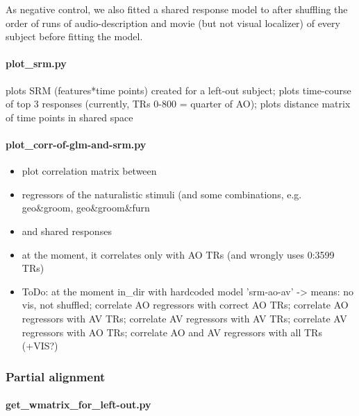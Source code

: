 As negative control, we also fitted a shared response model to after shuffling
the order of runs of audio-description and movie (but not visual localizer) of
every subject before fitting the model.


\paragraph{plot\_srm.py}

%
plots SRM (features*time points) created for a left-out subject; plots
time-course of top 3 responses (currently, TRs 0-800 = quarter of AO); plots
distance matrix of time points in shared space


\paragraph{plot\_corr-of-glm-and-srm.py}
%
\begin{itemize}
    \item plot correlation matrix between
    \item regressors of the naturalistic stimuli (and some combinations, e.g.
        geo\&groom, geo\&groom\&furn
    \item and shared responses
    \item at the moment, it correlates only with AO TRs (and wrongly uses
        0:3599 TRs)
    \item ToDo: at the moment in\_dir with hardcoded model 'srm-ao-av'
    ->  means: no vis, not shuffled; correlate AO regressors with correct AO
        TRs; correlate AO regressors with AV TRs; correlate AV regressors with
        AV TRs; correlate AV regressors with AO TRs; correlate AO and AV
        regressors with all TRs (+VIS?)
\end{itemize}


\subsubsection{Partial alignment}


\paragraph{get\_wmatrix\_for\_left-out.py}

